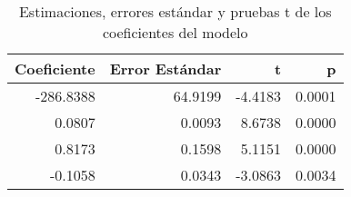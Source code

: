 \begin{table}
\caption{Estimaciones, errores estándar y pruebas t de los coeficientes del modelo}
\label{tab:coeficientes_regresion}
\begin{tabular}{rrrr}
\toprule
Coeficiente & Error Estándar & t & p \\
\midrule
-286.8388 & 64.9199 & -4.4183 & 0.0001 \\
0.0807 & 0.0093 & 8.6738 & 0.0000 \\
0.8173 & 0.1598 & 5.1151 & 0.0000 \\
-0.1058 & 0.0343 & -3.0863 & 0.0034 \\
\bottomrule
\end{tabular}
\end{table}
